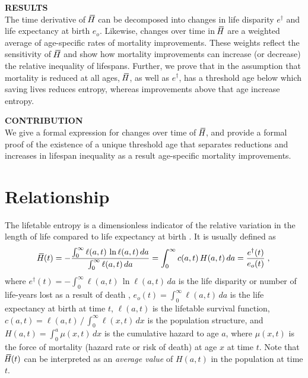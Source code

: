 \documentclass[a4paper,twoside, openright, 12pt, leqno]{article}
\newcommand*\xbar[1]{%
   \hbox{%
     \vbox{%
       \hrule height 0.5pt %
       \kern0.3ex%
       \hbox{%
         \kern-0.28em%
         \ensuremath{#1}%
         \kern-0.05em%
       }%
     }%
   }%
}
\begin{document}
\noindent\textbf{RESULTS} \\
The time derivative of $\,\xbar{H}$ can be decomposed into changes in life disparity $e^\dagger$ and life expectancy at birth $e_o$. Likewise, changes over time in $\,\xbar{H}$ are a weighted average of age-specific rates of mortality improvements. These weights reflect the sensitivity of $\,\xbar{H}$ and show how mortality improvements can increase (or decrease) the relative inequality of lifespans. Further, we prove that in the assumption that mortality is reduced at all ages, $\,\xbar{H}$, as well as $e^\dagger$, has a threshold age below which saving lives reduces entropy, whereas improvements above that age increase entropy.
\bigskip

\noindent\textbf{CONTRIBUTION} \\
We give a formal expression for changes over time of $\,\xbar{H}$, and provide a formal proof of the existence of a unique threshold age that separates reductions and increases in lifespan inequality as a result age-specific mortality improvements.

\linespread{2}\normalsize
\clearpage



\section{Relationship}
The lifetable entropy is a dimensionless indicator of the relative variation in the length of life compared to life expectancy at birth \citep{keyfitz1968introduction,demetrius1974demographic,Keyfitz1977, demetrius1978adaptive}. It is usually defined as
%
\begin{equation*}
\xbar{H}(t)=-\frac{\int_0^\infty\ell(a, t)\,\ln\ell(a, t)\,da}{\int_0^\infty\ell(a, t)\,da}=\int_0^\infty c(a, t)\,H(a,t)\,da=\frac{e^\dagger(t)}{e_o(t)}\;,
\end{equation*}
%
where $e^\dagger(t)=-\int_0^\infty\ell(a,t)\,\ln\ell(a,t)\,da$ is the life disparity or number of life-years lost as a result of death \citep{Vaupel2003}, $e_o(t)=\int_0^\infty\ell(a, t)\,da$ is the life expectancy at birth at time $t$, $\ell(a,t)$ is the lifetable survival function, $c(a,t)=\ell(a,t)\,/\,\int_0^\infty\ell(x,t)\,dx$ is the population structure, and $H(a,t)=\int_0^a\mu(x,t)\,dx$ is the cumulative hazard to age $a$, where $\mu(x,t)$ is the force of mortality (hazard rate or risk of death) at age $x$ at time $t$. Note that $\,\xbar{H}(t)$ can be interpreted as an \emph{average value} of $H(a,t)$ in the population at time $t$.
\end{document}
